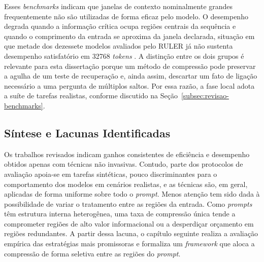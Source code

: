 Esses \textit{benchmarks} indicam que janelas de contexto nominalmente grandes frequentemente não são utilizadas de forma eficaz pelo modelo. O desempenho degrada quando a informação crítica ocupa regiões centrais da sequência \cite{liu2024lostmiddle} e quando o comprimento da entrada se aproxima da janela declarada, situação em que metade dos dezessete modelos avaliados pelo RULER já não sustenta desempenho satisfatório em 32768 \textit{tokens} \cite{hsieh2024ruler}. A distinção entre os dois grupos é relevante para esta dissertação porque um método de compressão pode preservar a agulha de um teste de recuperação e, ainda assim, descartar um fato de ligação necessário a uma pergunta de múltiplos saltos. Por essa razão, a fase local adota a suíte de tarefas realistas, conforme discutido na Seção~\ref{subsec:revisao-benchmarks}.

\subsection{Síntese e Lacunas Identificadas}
\label{subsec:lacunas}

Os trabalhos revisados indicam ganhos consistentes de eficiência e desempenho obtidos apenas com técnicas não invasivas. Contudo, parte dos protocolos de avaliação apoia-se em tarefas sintéticas, pouco discriminantes para o comportamento dos modelos em cenários realistas, e as técnicas são, em geral, aplicadas de forma uniforme sobre todo o \textit{prompt}. Menos atenção tem sido dada à possibilidade de variar o tratamento entre as regiões da entrada. Como \textit{prompts} têm estrutura interna heterogênea, uma taxa de compressão única tende a comprometer regiões de alto valor informacional ou a desperdiçar orçamento em regiões redundantes. A partir dessa lacuna, o capítulo seguinte realiza a avaliação empírica das estratégias mais promissoras e formaliza um \textit{framework} que aloca a compressão de forma seletiva entre as regiões do \textit{prompt}.
